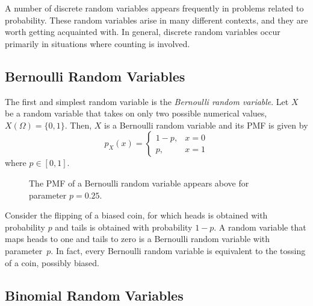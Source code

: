 A number of discrete random variables appears frequently in problems related to probability.
These random variables arise in many different contexts, and they are worth getting acquainted with.
In general, discrete random variables occur primarily in situations where counting is involved.


\subsection{Bernoulli Random Variables}

The first and simplest random variable is the \emph{Bernoulli random variable}. 
Let $X$ be a random variable that takes on only two possible numerical values, $X(\Omega) = \{0, 1\}$.
Then, $X$ is a Bernoulli random variable and its PMF is given by
\begin{equation*}
p_X (x) = \begin{cases}
1 - p, & x = 0 \\
p, & x = 1
\end{cases}
\end{equation*}
where $p \in [0, 1]$.

\begin{figure}[ht]
\begin{center}
\end{center}
\caption{The PMF of a Bernoulli random variable appears above for parameter $p = 0.25$.}
\end{figure}

\begin{example}
Consider the flipping of a biased coin, for which heads is obtained with probability $p$ and tails is obtained with probability $1-p$.
A random variable that maps heads to one and tails to zero is a Bernoulli random variable with parameter~$p$.
In fact, every Bernoulli random variable is equivalent to the tossing of a coin, possibly biased.
\end{example}


\subsection{Binomial Random Variables}
\label{subsection:BinomialRandomVariables}


